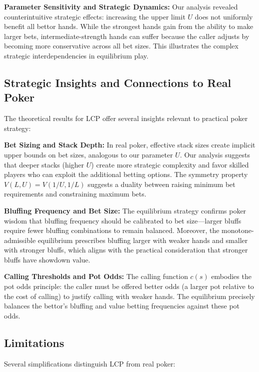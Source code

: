 \documentclass[../../main/main.tex]{subfiles}
\begin{document}
\textbf{Parameter Sensitivity and Strategic Dynamics:} Our analysis revealed counterintuitive strategic effects: increasing the upper limit $U$ does not uniformly benefit all bettor hands. While the strongest hands gain from the ability to make larger bets, intermediate-strength hands can suffer because the caller adjusts by becoming more conservative across all bet sizes. This illustrates the complex strategic interdependencies in equilibrium play.

\subsection{Strategic Insights and Connections to Real Poker}

The theoretical results for LCP offer several insights relevant to practical poker strategy:

\textbf{Bet Sizing and Stack Depth:} In real poker, effective stack sizes create implicit upper bounds on bet sizes, analogous to our parameter $U$. Our analysis suggests that deeper stacks (higher $U$) create more strategic complexity and favor skilled players who can exploit the additional betting options. The symmetry property $V(L,U) = V(1/U, 1/L)$ suggests a duality between raising minimum bet requirements and constraining maximum bets.

\textbf{Bluffing Frequency and Bet Size:} The equilibrium strategy confirms poker wisdom that bluffing frequency should be calibrated to bet size---larger bluffs require fewer bluffing combinations to remain balanced. Moreover, the monotone-admissible equilibrium prescribes bluffing larger with weaker hands and smaller with stronger bluffs, which aligns with the practical consideration that stronger bluffs have showdown value.

\textbf{Calling Thresholds and Pot Odds:} The calling function $c(s)$ embodies the pot odds principle: the caller must be offered better odds (a larger pot relative to the cost of calling) to justify calling with weaker hands. The equilibrium precisely balances the bettor's bluffing and value betting frequencies against these pot odds.

\subsection{Limitations}

Several simplifications distinguish LCP from real poker:
\end{document}
